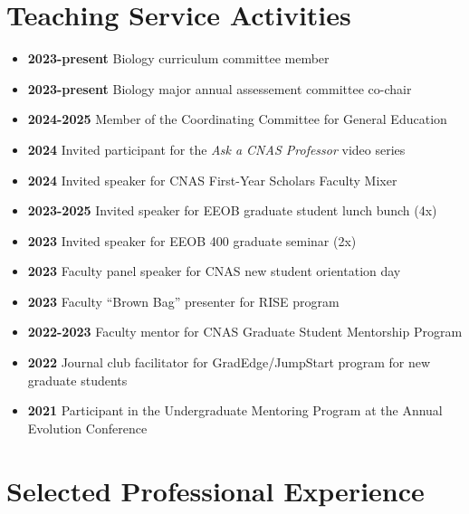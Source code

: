 \documentclass[]{article}
\providecommand{\tightlist}{%
  \setlength{\itemsep}{0pt}\setlength{\parskip}{3pt}}
\begin{document}
\vspace{1mm}

\section{\fontsize{16}{48}\selectfont Teaching Service Activities}

\vspace{1.5mm}

\begin{itemize}
\tightlist

\item{\textbf{2023-present} Biology curriculum committee member}
\item{\textbf{2023-present} Biology major annual assessement committee co-chair}
\item{\textbf{2024-2025} Member of the Coordinating Committee for General Education}
\item{\textbf{2024} Invited participant for the \textit{Ask a CNAS Professor} video series}
\item{\textbf{2024} Invited speaker for CNAS First-Year Scholars Faculty Mixer}
\item{\textbf{2023-2025} Invited speaker for EEOB graduate student lunch bunch (4x)}
\item{\textbf{2023} Invited speaker for EEOB 400 graduate seminar (2x)}
\item{\textbf{2023} Faculty panel speaker for CNAS new student orientation day}
\item{\textbf{2023} Faculty ``Brown Bag'' presenter for RISE program}
\item{\textbf{2022-2023} Faculty mentor for CNAS Graduate Student Mentorship Program}
\item{\textbf{2022} Journal club facilitator for GradEdge/JumpStart program for new graduate students}
\item{\textbf{2021} Participant in the Undergraduate Mentoring Program at the Annual Evolution Conference}
\end{itemize}

\vspace{3mm}
\section{\fontsize{16}{48}\selectfont Selected Professional Experience}
\end{document}
